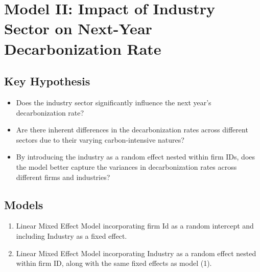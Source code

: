 \section{Model II: Impact of Industry Sector on Next-Year Decarbonization Rate}

\subsection{Key Hypothesis}
\begin{itemize}
    \item Does the industry sector significantly influence the next year's decarbonization rate?
    \item Are there inherent differences in the decarbonization rates across different sectors due to their varying carbon-intensive natures?
    \item By introducing the industry as a random effect nested within firm IDs, does the model better capture the variances in decarbonization rates across different firms and industries?
\end{itemize}

\subsection{Models} 
\begin{enumerate}
    \item Linear Mixed Effect Model incorporating firm Id as a random intercept and including Industry as a fixed effect.
    \item Linear Mixed Effect Model incorporating Industry as a random effect nested within firm ID, along with the same fixed effects as model (1).
\end{enumerate}




